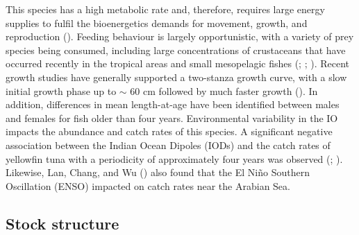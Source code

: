 \documentclass[
]{scrartcl}
\begin{document}
This species has a high metabolic rate and, therefore, requires large
energy supplies to fulfil the bioenergetics demands for movement,
growth, and reproduction
(). Feeding behaviour is largely opportunistic, with a variety
of prey species being consumed, including large concentrations of
crustaceans that have occurred recently in the tropical areas and small
mesopelagic fishes
(; ; ).
Recent growth studies have generally supported a two-stanza growth
curve, with a slow initial growth phase up to \(\sim\) 60 cm followed by
much faster growth (). In addition, differences in mean length-at-age
have been identified between males and females for fish older than four
years. Environmental variability in the IO impacts the abundance and
catch rates of this species. A significant negative association between
the Indian Ocean Dipoles (IODs) and the catch rates of yellowfin tuna
with a periodicity of approximately four years was observed
(; ). Likewise, Lan, Chang, and Wu
() also found
that the El Niño Southern Oscillation (ENSO) impacted on catch rates
near the Arabian Sea.

\subsection{Stock structure}\label{stock-structure}
\end{document}
